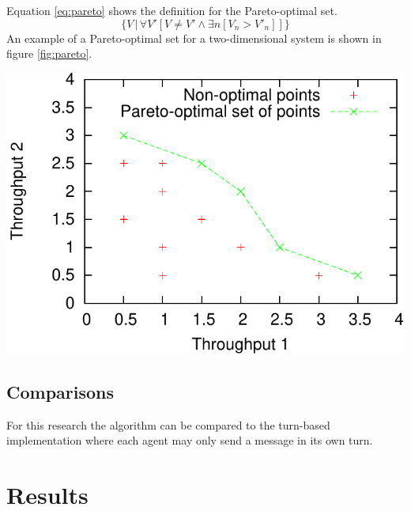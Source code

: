 \documentclass{article}
\makeatletter
\newenvironment{figurehere}
{\def\@captype{figure}}
{}
\makeatother
\begin{document}
\begin{multicols}{2}
		Equation \ref{eq:pareto} shows the definition for the Pareto-optimal set.
		\begin{equation}
			\label{eq:pareto}
			\Big\{ V\, \Big| \, \forall V'[ V \neq V' \land \exists n [V_n > V'_n]] \Big\}
		\end{equation}
		An example of a Pareto-optimal set for a two-dimensional system is shown in
		figure \ref{fig:pareto}.

		\begin{figurehere}
			\centering
			\includegraphics[scale=0.68]{images/pareto}
			\label{fig:pareto}
		\end{figurehere}


		\subsection{Comparisons}
		\label{sub:comparisons}
		For this research the algorithm can be compared to the turn-based
		implementation where each agent may only send a message in its own turn.


	\end{multicols}
	\section{Results}
	\label{sec:results}
\end{document}
